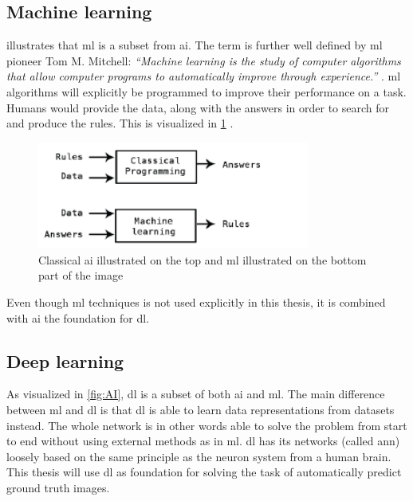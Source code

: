 \documentclass[USenglish]{ifimaster}  %
\begin{document}
\subsection{Machine learning}
 illustrates that \ac{ml} is a subset from \ac{ai}. The term is further well defined by \ac{ml} pioneer Tom M. Mitchell:
\newline
\newline
\textit{“Machine learning is the study of computer algorithms that allow computer programs to automatically improve through experience.”} \cite{tom_mitchell}.
\newline
\newline
\ac{ml} algorithms will explicitly be programmed to improve their performance on a task. Humans would provide the data, along with the answers in order to search for and produce the rules. This is visualized in \cref{fig:ml} \cite{Francois_Deep_learning_with_python}.
\begin{figure}[ht]
    \centering
    \includegraphics[width=0.8\textwidth]{bilder/ml.png}
    \caption{Classical \ac{ai} illustrated on the top and \ac{ml} illustrated on the bottom part of the image \cite{Francois_Deep_learning_with_python}}
    \label{fig:ml}
\end{figure}

Even though \ac{ml} techniques is not used explicitly in this thesis, it is combined with \ac{ai} the foundation for \ac{dl}.

\subsection{Deep learning}
As visualized in \cref{fig:AI}, \ac{dl} is a subset of both \ac{ai} and \ac{ml}. The main difference between \ac{ml} and \ac{dl} is that \ac{dl} is able to learn data representations from datasets instead. The whole network is in other words able to solve the problem from start to end without using external methods as in \ac{ml}. \ac{dl} has its networks (called \ac{ann}) loosely based on the same principle as the neuron system from a human brain. This thesis will use \ac{dl} as foundation for solving the task of automatically predict ground truth images. 
\end{document}
